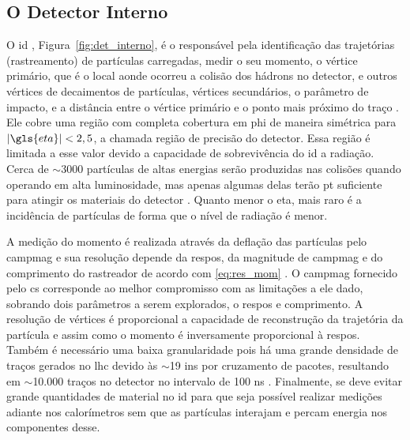 \subsection{O Detector Interno}
\label{ssec:det_int}



O \gls{id} \cite{inner_tdr1,inner_tdr2}, Figura~\ref{fig:det_interno}, é o responsável pela identificação das 
trajetórias (rastreamento) de partículas carregadas, medir o seu momento, o
vértice primário, que é o local aonde ocorreu a colisão dos hádrons no detector, e outros
vértices de decaimentos de partículas, vértices secundários, o parâmetro de
impacto, e a distância entre o vértice primário e o ponto mais próximo do traço
\cite{tese_jatos,ATLAS_TDR}. Ele cobre uma região com completa cobertura em
\gls{phi} de maneira simétrica para $|\gls{eta}| < 2,5$, a chamada região de precisão
do detector. Essa região é limitada a esse valor devido 
a capacidade de sobrevivência do \gls{id} a radiação. 
Cerca de $\sim3000$ partículas de altas energias serão produzidas nas colisões
quando operando em alta luminosidade, mas apenas algumas delas terão \gls{pt}
suficiente para atingir os materiais do detector \cite{radiacao}. Quanto menor o \gls{eta},
mais raro é a incidência de partículas de forma que o nível de radiação é menor.

A medição do momento é realizada através da deflação das partículas pelo
\gls{campmag} e sua resolução depende da \gls{respos}, da magnitude de
\gls{campmag} e do \gls{comprimento} do rastreador de acordo com \ref{eq:res_mom}
\cite{lecture_slides_1,lecture_slides_2}. O \gls{campmag} fornecido pelo
\gls{cs} corresponde ao melhor compromisso com as limitações a ele dado,
sobrando dois parâmetros a serem explorados, o \gls{respos} e \gls{comprimento}. 
A resolução de vértices é proporcional a
capacidade de reconstrução da trajetória da partícula e assim como o momento
é inversamente proporcional à \gls{respos}. 
Também é necessário uma baixa granularidade pois há uma grande densidade de
traços gerados no \gls{lhc} devido às  $\sim$19 \glspl{in} por cruzamento de pacotes,
resultando em $\sim$10.000 traços no detector no intervalo de 100 ns \cite{resumo_ATLAS}.
Finalmente, se deve evitar grande quantidades de material no \gls{id} 
para que seja possível realizar medições adiante nos calorímetros sem que as partículas 
interajam e percam energia nos componentes desse.

